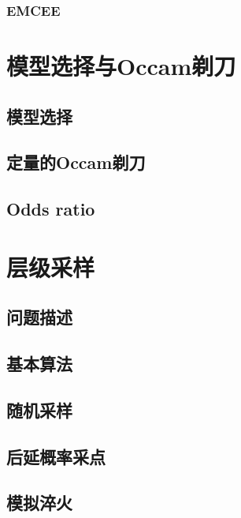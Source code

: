 \subsubsection{EMCEE}

\section{模型选择与Occam剃刀}
\subsection{模型选择}
\subsection{定量的Occam剃刀}
\subsection{Odds ratio}

\section{层级采样}
\subsection{问题描述}
\subsection{基本算法}
\subsection{随机采样} 
\subsection{后延概率采点}
\subsection{模拟淬火}

